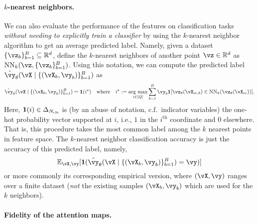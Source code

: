 \documentclass[\toplevelprefix/book-main.tex]{subfiles}
\begin{document}
\paragraph{\(k\)-nearest neighbors.}  We can also evaluate the performance of the features on classification tasks \textit{without needing to explicitly train a classifier} by using the \(k\)-nearest neighbor algorithm to get an average predicted label. Namely, given a dataset \(\{\vz_{b}\}_{b = 1}^{B} \subseteq \R^{d}\), define the \(k\)-nearest neighbors of another point \(\vz \in \R^{d}\) as \(\operatorname{NN}_{k}(\vz, \{\vz_{b}\}_{b = 1}^{B})\). Using this notation, we can compute the predicted label \(\hat{\vy}_{\theta}(\vX \mid \{(\vX_{b}, \vy_{b})\}_{b = 1}^{B})\) as 
\begin{equation}
    \hat{\vy}_{\theta}(\vX \mid \{(\vX_{b}, \vy_{b})\}_{b = 1}^{B}) = \vone(i^{\star}) \quad \text{where} \quad i^{\star} := \argmax_{i \in [Q]}\sum_{b = 1}^{B}\vy_{b}\indvar[\vz_{\theta}(\vX_{\cc, b}) \in \operatorname{NN}_{k}(\vz_{\theta}(\vX_{\cc}))].
\end{equation}
Here, \(\bm{1}(i) \in \Delta_{N_{\mathrm{cls}}}\) is (by an abuse of notation, c.f.~indicator variables) the one-hot probability vector supported at \(i\), i.e., \(1\) in the \(i^{\mathrm{th}}\) coordinate and \(0\) elsewhere. That is, this procedure takes the most common label among the \(k\) nearest points in feature space. The \(k\)-nearest neighbor classification accuracy is just the accuracy of this predicted label, namely,
\begin{equation}
    \Ex_{\vX, \vy}[\indvar(\hat{\vy}_{\theta}(\vX \mid \{(\vX_{b}, \vy_{b})\}_{b = 1}^{B}) = \vy)]
\end{equation}
or more commonly its corresponding empirical version, where \((\vX, \vy)\) ranges over a finite dataset (\textit{not} the existing samples \((\vX_{b}, \vy_{b})\) which are used for the \(k\) neighbors).

\paragraph{Fidelity of the attention maps.}
\end{document}
